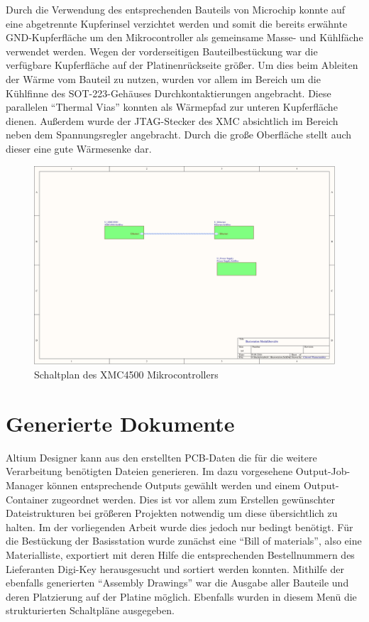 Durch die Verwendung des entsprechenden Bauteils von Microchip konnte auf eine abgetrennte Kupferinsel verzichtet werden und somit die bereits erwähnte \acs{GND}-Kupferfläche um den Mikrocontroller als gemeinsame Masse- und Kühlfäche verwendet werden.
Wegen der vorderseitigen Bauteilbestückung war die verfügbare Kupferfläche auf der Platinenrückseite  größer. Um dies beim Ableiten der Wärme vom Bauteil zu nutzen, wurden vor allem im Bereich um die Kühlfinne des \ac{SOT}-223-Gehäuses Durchkontaktierungen angebracht. Diese parallelen \enquote{Thermal Vias} konnten als Wärmepfad zur unteren Kupferfläche dienen. Außerdem wurde der \ac{JTAG}-Stecker des XMC absichtlich im Bereich neben dem Spannungsregler angebracht. Durch die große Oberfläche stellt auch dieser eine gute Wärmesenke dar. %
\begin{figure}[h]
	\centering
	\includegraphics[width=\linewidth,page=5]{"../../Altium/mobile Basisstation/Project Outputs for mobile Basisstation/Basisstation Schematics"}
	\caption{Schaltplan des XMC4500 Mikrocontrollers}
	\label{fig:schemXMC}
\end{figure}




\section{Generierte Dokumente}
Altium Designer kann aus den erstellten \ac{PCB}-Daten die für die weitere Verarbeitung benötigten Dateien generieren. Im dazu vorgesehene Output-Job-Manager können entsprechende Outputs gewählt werden und einem Output-Container zugeordnet werden. Dies ist vor allem zum Erstellen gewünschter Dateistrukturen bei größeren Projekten notwendig um diese übersichtlich zu halten. Im der vorliegenden Arbeit wurde dies jedoch nur bedingt benötigt.
Für die Bestückung der Basisstation wurde zunächst eine \enquote{Bill of materials}, also eine Materialliste, exportiert mit deren Hilfe die entsprechenden Bestellnummern des Lieferanten Digi-Key herausgesucht und sortiert werden konnten. Mithilfe der ebenfalls generierten \enquote{Assembly Drawings} war die Ausgabe aller Bauteile und deren Platzierung auf der Platine möglich. Ebenfalls wurden in diesem Menü die strukturierten Schaltpläne ausgegeben.

